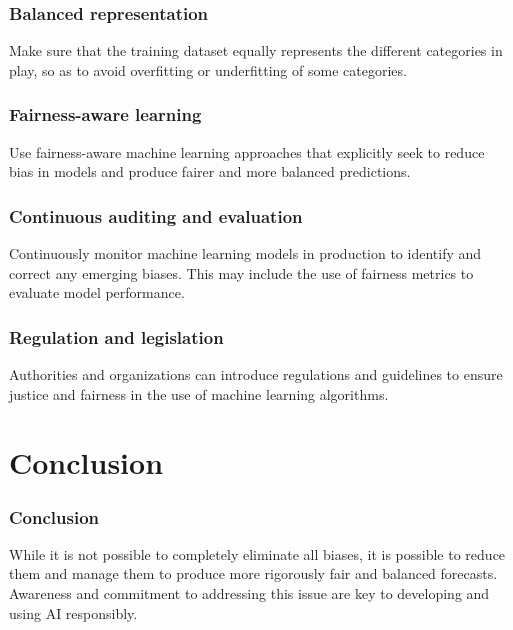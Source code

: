 \documentclass{beamer}
\numberwithin{figure}{section}
\numberwithin{equation}{section}
\begin{document}
\begin{frame}
 \frametitle{Balanced representation}
    Make sure that the training dataset equally represents the different categories in play, so as to avoid overfitting or underfitting of some categories.
\end{frame}

\begin{frame}
 \frametitle{Fairness-aware learning}
    Use fairness-aware machine learning approaches that explicitly seek to reduce bias in models and produce fairer and more balanced predictions.
\end{frame}

\begin{frame}
 \frametitle{Continuous auditing and evaluation}
    Continuously monitor machine learning models in production to identify and correct any emerging biases. This may include the use of fairness metrics to evaluate model performance.
\end{frame}

\begin{frame}
 \frametitle{Regulation and legislation}
    Authorities and organizations can introduce regulations and guidelines to ensure justice and fairness in the use of machine learning algorithms.
\end{frame}


\section{Conclusion}
\begin{frame}
 \frametitle{Conclusion}
    While it is not possible to completely eliminate all biases, it is possible to reduce them and manage them to produce more rigorously fair and balanced forecasts. Awareness and commitment to addressing this issue are key to developing and using AI responsibly.
\end{frame}


\ThankYouFrame

\end{document}
